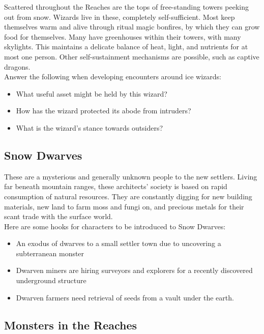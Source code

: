 \documentclass[notitlepage]{article}
\begin{document}
\begin{multicols}{2}
  Scattered throughout the Reaches are the tops of free-standing towers peeking out from snow.
  Wizards live in these, completely self-sufficient.
  Most keep themselves warm and alive through ritual magic bonfires, by which they can grow food for themselves.
  Many have greenhouses within their towers, with many skylights.
  This maintains a delicate balance of heat, light, and nutrients for at most one person.
  Other self-sustainment mechanisms are possible, such as captive dragons. \\

  Answer the following when developing encounters around ice wizards:

  \begin{itemize}
  \item What useful asset might be held by this wizard?
  \item How has the wizard protected its abode from intruders?
  \item What is the wizard's stance towards outsiders?
  \end{itemize}

  \subsection*{Snow Dwarves}

  These are a mysterious and generally unknown people to the new settlers.
  Living far beneath mountain ranges, these architects' society is based on rapid consumption of natural resources.
  They are constantly digging for new building materials, new land to farm moss and fungi on, and precious metals for their scant trade with the surface world. \\

  Here are some hooks for characters to be introduced to Snow Dwarves:

  \begin{itemize}
  \item An exodus of dwarves to a small settler town due to uncovering a subterranean monster
  \item Dwarven miners are hiring surveyors and explorers for a recently discovered underground structure
  \item Dwarven farmers need retrieval of seeds from a vault under the earth.
  \end{itemize}


  \subsection*{Monsters in the Reaches}


\end{multicols}
\end{document}
